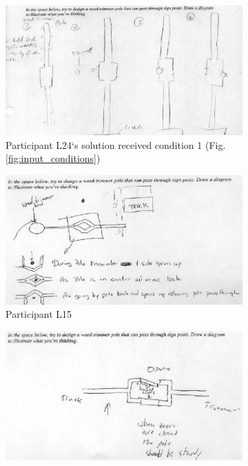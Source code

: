 \documentclass[12pt]{article}
\begin{document}
\begin{figure}[h!]
  \centering
    \begin{subfigure}[b]{0.8\linewidth}
    \includegraphics[width=\linewidth]{images/drawing_l24_con2.PNG}
    \caption{Participant L24`s solution received condition 1 (Fig. \ref{fig:input_conditions})}
  \end{subfigure}
  \begin{subfigure}[b]{0.3\linewidth}
    \includegraphics[width=\linewidth]{images/drawing_l15_con2.PNG}
     \caption{Participant L15}
  \end{subfigure}
  \begin{subfigure}[b]{0.3\linewidth}
    \includegraphics[width=\linewidth]{images/drawing_l16_con1.PNG}

\end{subfigure}
\end{figure}
\end{document}
